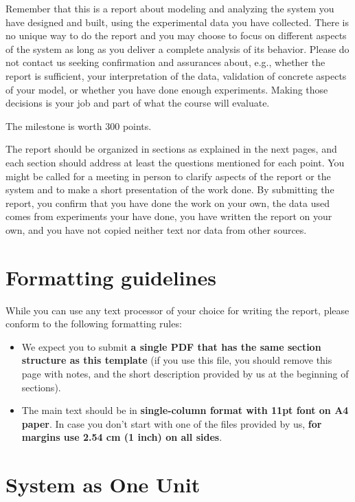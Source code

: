 \documentclass[11pt]{article}
\begin{document}
Remember  that  this is  a  report  about modeling  and  analyzing the  system you  have  designed  and  built, using  the experimental data you have collected. There is no unique way to do the report and you may choose  to  focus  on  different  aspects  of  the  system  as  long  as  you deliver a  complete analysis of  its behavior. Please do not contact us seeking confirmation and assurances about, e.g., whether the report is  sufficient,  your  interpretation  of  the  data,  validation  of  concrete  aspects  of  your model, or  whether you have done enough experiments. Making those decisions is your job and part of what the course will evaluate. 

The milestone is worth 300 points. 

The report should be organized in sections as explained in the next pages, and each section should address at least the questions mentioned for each point. You might be called for a meeting in person to clarify aspects of the report or the system and to make a short presentation of the work done. By submitting the report, you  confirm  that  you  have  done  the  work  on  your  own,  the  data used comes  from  experiments  your have  done,  you  have  written  the  report  on  your  own,  and  you have  not  copied  neither text  nor  data from other sources.

\section*{Formatting guidelines}
While you can use any text processor of your choice for writing the report, please conform to the following formatting rules:
\begin{itemize}
\item  We expect you to submit \textbf{a single PDF that has the same section structure as this template} (if you use this file, you should remove this page with notes, and the short description provided by us at the beginning of sections).
\item  The main text should be in \textbf{single-column format with 11pt font on A4 paper}. In case you don't start with one of the files provided by us, \textbf{for margins use 2.54 cm (1 inch) on all sides}.
\end{itemize}

\pagebreak


\section{System as One Unit}\label{sec:system-one-unit}
\end{document}
